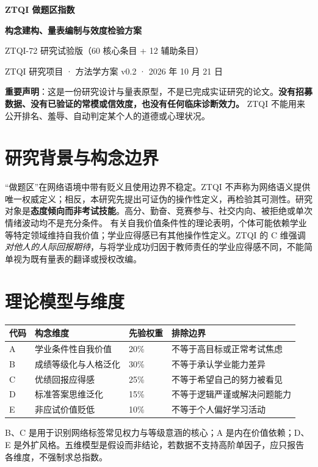 \documentclass[11pt,a4paper,UTF8,fontset=none]{ctexart}
\begin{document}
\begin{center}
{\Huge\sffamily\bfseries ZTQI 做题区指数}\par\vspace{6mm}
{\LARGE\bfseries 构念建构、量表编制与效度检验方案}\par\vspace{4mm}
{\large ZTQI-72 研究试验版（60 核心条目 + 12 辅助条目）}\par\vspace{3mm}
{\normalsize ZTQI 研究项目 · 方法学方案 v0.2 · 2026 年 10 月 21 日}
\end{center}
\vspace{8mm}
\noindent\colorbox{sky}{\parbox{0.95\linewidth}{\textbf{重要声明}：这是一份研究设计与量表原型，不是已完成实证研究的论文。\textbf{没有招募数据、没有已验证的常模或信效度，也没有任何临床诊断效力。} ZTQI 不能用来公开排名、羞辱、自动判定某个人的道德或心理状况。}}
\begin{abstract}
本文提出 ZTQI（ZuoTiQu Index，做题区指数）的操作性构念：个体把学业成绩与解题能力泛化为自我价值、对他人的等级评价、人际回报资格、现实问题的标准答案偏好以及对非应试价值的贬抑的倾向。为避免把刻苦学习和优秀成绩误认为该构念，设计五维、每维 12 题共 60 条核心条目，并增设 12 条辅助的注意力、社会赞许与外部效标候选条目，形成共 72 题的 ZTQI-72 试验问卷。本文预先给出评分流程、反向计分、缺失值规则、结果披露边界、纸笔 OMR 流程与分阶段效度研究方案。全部评分权重为先验可修改参数，任何阈值均不得在尚无验证的条件下解释为标准化诊断界值。
\end{abstract}
\tableofcontents\newpage
\section{研究背景与构念边界}
“做题区”在网络语境中带有贬义且使用边界不稳定。ZTQI 不声称为网络语义提供唯一权威定义；相反，本研究先提出可证伪的操作性定义，再检验其可测性。研究对象是\textbf{态度倾向而非考试技能}。高分、勤奋、竞赛参与、社交内向、被拒绝或单次情绪波动均不是充分条件。
有关自我价值条件性的理论表明，个体可能依赖学业等特定领域维持自我价值\cite{crocker2003,grades2003}；学业应得感已有其他操作性定义\cite{chowning2009}。ZTQI 的 C 维强调\emph{对他人的人际回报期待}，与将学业成功归因于教师责任的学业应得感不同，不能简单视为既有量表的翻译或授权改编。
\section{理论模型与维度}
\begin{longtable}{p{1.2cm}p{4.9cm}p{2cm}p{5.1cm}}
\toprule 代码&构念维度&先验权重&排除边界\\\midrule
A&学业条件性自我价值&20\%&不等于高目标或正常考试焦虑\\
B&成绩等级化与人格泛化&30\%&不等于承认学业能力差异\\
C&优绩回报应得感&25\%&不等于希望自己的努力被看见\\
D&标准答案思维泛化&15\%&不等于逻辑严谨或解决问题能力\\
E&非应试价值贬低&10\%&不等于个人偏好学习活动\\\bottomrule
\end{longtable}
B、C 是用于识别网络标签常见权力与等级意涵的核心；A 是内在价值依赖；D、E 是外扩风格。五维模型是假设而非结论，若数据不支持高阶单因子，应只报告各维度，不强制求总指数。
\end{document}
